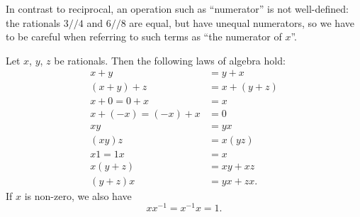 \begin{note}
    In contrast to reciprocal, an operation such as ``numerator'' is not well-defined:
    the rationals \(3 // 4\) and \(6 // 8\) are equal, but have unequal numerators, so we have to be careful when referring to such terms as ``the numerator of \(x\)''.
\end{note}

\begin{proposition}\label{4.2.4}
    Let \(x\), \(y\), \(z\) be rationals.
    Then the following laws of algebra hold:
    \begin{align*}
        x + y               & = y + x       \\
        (x + y) + z         & = x + (y + z) \\
        x + 0 = 0 + x       & = x           \\
        x + (-x) = (-x) + x & = 0           \\
        xy                  & = yx          \\
        (xy)z               & = x(yz)       \\
        x1 = 1x             & = x           \\
        x(y + z)            & = xy + xz     \\
        (y + z)x            & = yx + zx.
    \end{align*}
    If \(x\) is non-zero, we also have
    \[
        xx^{-1} = x^{-1}x = 1.
    \]
\end{proposition}

